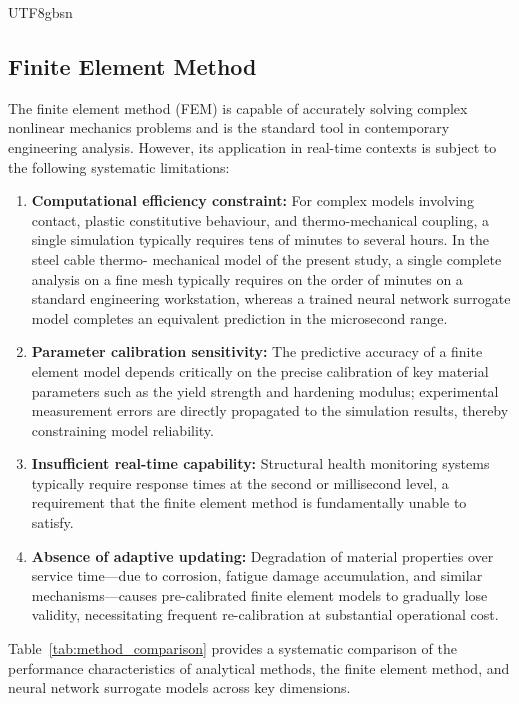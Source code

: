 \documentclass[a4paper,12pt]{report}
\begin{document}
\begin{CJK}{UTF8}{gbsn}
\subsection{Finite Element Method}
\label{subsec:intro_fem}

The finite element method (FEM) is capable of accurately solving complex nonlinear
mechanics problems and is the standard tool in contemporary engineering analysis. However,
its application in real-time contexts is subject to the following systematic limitations:

\begin{enumerate}
  \item \textbf{Computational efficiency constraint:} For complex models involving contact,
    plastic constitutive behaviour, and thermo-mechanical coupling, a single simulation
    typically requires tens of minutes to several hours. In the steel cable thermo-
    mechanical model of the present study, a single complete analysis on a fine mesh typically requires on the order of minutes 
on a standard engineering workstation, whereas a trained neural network surrogate 
model completes an equivalent prediction in the microsecond range.
  \item \textbf{Parameter calibration sensitivity:} The predictive accuracy of a finite
    element model depends critically on the precise calibration of key material parameters
    such as the yield strength and hardening modulus; experimental measurement errors are
    directly propagated to the simulation results, thereby constraining model reliability.
  \item \textbf{Insufficient real-time capability:} Structural health monitoring systems
    typically require response times at the second or millisecond level, a requirement
    that the finite element method is fundamentally unable to satisfy.
  \item \textbf{Absence of adaptive updating:} Degradation of material properties over
    service time---due to corrosion, fatigue damage accumulation, and similar
    mechanisms---causes pre-calibrated finite element models to gradually lose validity,
    necessitating frequent re-calibration at substantial operational cost.
\end{enumerate}

Table~\ref{tab:method_comparison} provides a systematic comparison of the performance
characteristics of analytical methods, the finite element method, and neural network
surrogate models across key dimensions.


\end{CJK}
\end{document}
